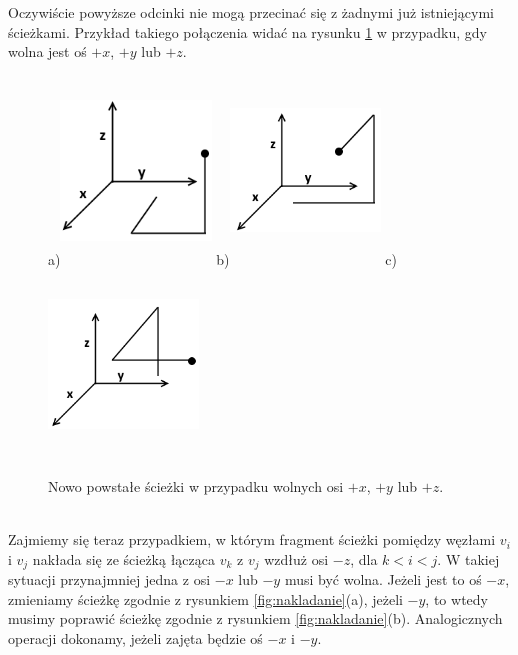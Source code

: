 \documentclass[brudnopis]{xmgr}
\theoremstyle{definition}
\begin{document}
Oczywiście powyższe odcinki nie mogą przecinać się z żadnymi już istniejącymi ścieżkami. Przykład takiego połączenia widać na rysunku \ref{fig:nowe sciezki} w przypadku, gdy wolna jest oś $+x$, $+y$ lub $+z$.
\begin{figure}[ht!]
  \centering
  a)\includegraphics[width=4cm,height=5cm]{rysunki/wolne_x.png}
  b)\includegraphics[width=4cm,height=5cm]{rysunki/wolne_y.png}
  c)\includegraphics[width=4cm,height=5cm]{rysunki/wolne_z.png}
  \caption{Nowo powstałe ścieżki w przypadku wolnych osi $+x$, $+y$ lub $+z$.}
  \label{fig:nowe sciezki}
\end{figure} 
\\\indent Zajmiemy się teraz przypadkiem, w którym fragment ścieżki pomiędzy węzłami $v_i$ i $v_j$ nakłada się ze ścieżką łącząca $v_k$ z $v_j$ wzdłuż osi $-z$, dla $k < i < j$. W takiej sytuacji przynajmniej jedna z osi $-x$ lub $-y$ musi być wolna. Jeżeli jest to oś $-x$, zmieniamy ścieżkę zgodnie z rysunkiem \ref{fig:nakladanie}(a), jeżeli $-y$, to wtedy musimy poprawić ścieżkę zgodnie z rysunkiem \ref{fig:nakladanie}(b). Analogicznych operacji dokonamy, jeżeli zajęta będzie oś $-x$ i $-y$.
\end{document}
